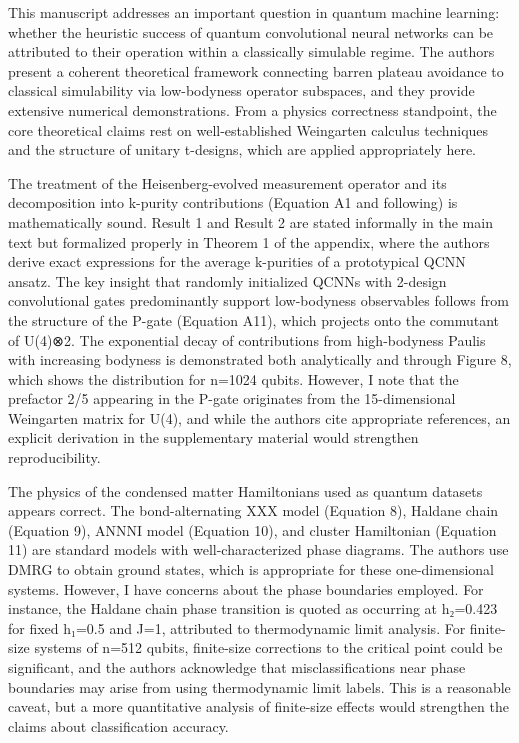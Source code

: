 \documentclass[10pt,letterpaper]{article}
\begin{document}
This manuscript addresses an important question in quantum machine learning: whether the heuristic success of quantum convolutional neural networks can be attributed to their operation within a classically simulable regime. The authors present a coherent theoretical framework connecting barren plateau avoidance to classical simulability via low-bodyness operator subspaces, and they provide extensive numerical demonstrations. From a physics correctness standpoint, the core theoretical claims rest on well-established Weingarten calculus techniques and the structure of unitary t-designs, which are applied appropriately here.

The treatment of the Heisenberg-evolved measurement operator and its decomposition into k-purity contributions (Equation A1 and following) is mathematically sound. Result 1 and Result 2 are stated informally in the main text but formalized properly in Theorem 1 of the appendix, where the authors derive exact expressions for the average k-purities of a prototypical QCNN ansatz. The key insight that randomly initialized QCNNs with 2-design convolutional gates predominantly support low-bodyness observables follows from the structure of the P-gate (Equation A11), which projects onto the commutant of U(4)⊗2. The exponential decay of contributions from high-bodyness Paulis with increasing bodyness is demonstrated both analytically and through Figure 8, which shows the distribution for n=1024 qubits. However, I note that the prefactor 2/5 appearing in the P-gate originates from the 15-dimensional Weingarten matrix for U(4), and while the authors cite appropriate references, an explicit derivation in the supplementary material would strengthen reproducibility.

The physics of the condensed matter Hamiltonians used as quantum datasets appears correct. The bond-alternating XXX model (Equation 8), Haldane chain (Equation 9), ANNNI model (Equation 10), and cluster Hamiltonian (Equation 11) are standard models with well-characterized phase diagrams. The authors use DMRG to obtain ground states, which is appropriate for these one-dimensional systems. However, I have concerns about the phase boundaries employed. For instance, the Haldane chain phase transition is quoted as occurring at h₂=0.423 for fixed h₁=0.5 and J=1, attributed to thermodynamic limit analysis. For finite-size systems of n=512 qubits, finite-size corrections to the critical point could be significant, and the authors acknowledge that misclassifications near phase boundaries may arise from using thermodynamic limit labels. This is a reasonable caveat, but a more quantitative analysis of finite-size effects would strengthen the claims about classification accuracy.
\end{document}
